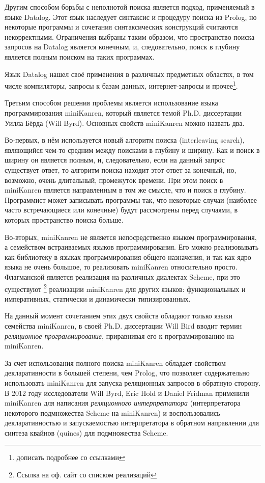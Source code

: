 Другим способом борьбы с неполнотой поиска является подход, применяемый в языке Datalog. Этот язык наследует синтаксис и процедуру поиска из Prolog, но некоторые программы и сочетания синтаксических конструкций считаются некорректными. Ограничения выбраны таким образом, что пространство поиска запросов на Datalog является конечным, и, следовательно, поиск в глубину является полным поиском на таких программах. 

Язык Datalog нашел своё применения в различных предметных областях, в том числе компиляторы, запросы к базам данных, интернет-запросы и прочее\footnote{дописать подробнее со ссылками}.

Третьим способом решения проблемы является использование языка программирования miniKanren, который является темой Ph.D. диссертации Уилла Бёрда (Will Byrd). Основных свойств miniKanren можно назвать два.

Во-первых, в нём используется новый алгоритм поиска (interleaving search), являющийся чем-то средним между поисками в глубину и ширину. Как и поиск в ширину он является полным, и, следовательно, если на данный запрос существует ответ, то алгоритм поиска находит этот ответ за конечный, но, возможно, очень длительный, промежуток времени. При этом поиск в miniKanren является направленным в том же смысле, что и поиск в глубину. Программист может записывать программы так, что некоторые случаи (наиболее часто встречающиеся или конечные) будут рассмотрены перед случаями, в которых пространство поиска больше.

Во-вторых, miniKanren не является непосредственно языком программирования, а семейством встраиваемых языков программирования. Его можно реализовывать как библиотеку в языках программирования общего назначения, и так как ядро языка не очень большое, то реализовать miniKanren относительно просто. Флагманской является реализация на различных диалектах Scheme, при это существуют \footnote{Ссылка на оф. сайт со списком реализаций} реализации miniKanren для других языков: функциональных и императивных, статически и динамически типизированных.

На данный момент сочетанием этих двух свойств обладают только языки семейства miniKanren, в своей Ph.D. диссертации Will Bird вводит термин \emph{реляционное программирование}, приравнивая его к программированию на miniKanren.

За счет использования полного поиска miniKanren обладает свойством декларативности в большей степени, чем Prolog, что позволяет содержательно использовать miniKanren для запуска реляционных запросов в обратную сторону. В 2012 году исследователи Will Byrd, Eric Hold и Daniel Fridman применили miniKanren для написания \emph{реляционного интерпретатора} (интерпретатора некоторого подмножества Scheme на miniKanren) и воспользовались декларативностью и запускаемостью интерпретатора в обратном направлении для синтеза квайнов (quines) для подмножества Scheme.

